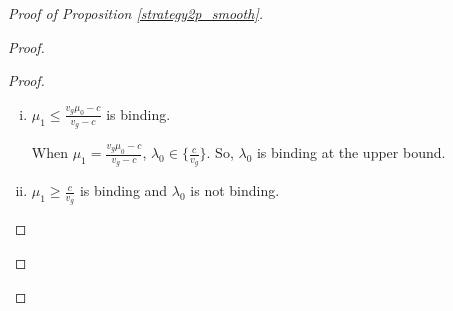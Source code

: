 \documentclass[11pt]{extarticle}
\newcommand{\ra}{\Rightarrow}
\begin{document}
\begin{proof}[Proof of Proposition \ref{strategy2p_smooth}]
\begin{enumerate}
\begin{proof}
\begin{proof}
\begin{enumerate}[i)]
					F.O.C. $\ra \begin{cases}
					-K'(\lambda_0) + p +K(\frac{\mu_1-c}{-v_b})+\frac{(\mu_1-c)p}{v_b}-\eta = 0 \\
					(1-\lambda_0) \left[K'(\frac{\mu_1-c}{-v_b})\cdot \frac{1}{v_b}-\frac{p}{v_b}\right]+\eta \cdot \frac{\mu_0+v_b-c}{(v_b+\mu_1)^2}=0
					\end{cases}$
					
					Plug in $\lambda_0 = \frac{\mu_0-\mu_1-c}{-v_b-\mu_1}$. Dividing the second equality by $\frac{\mu_0+v_b-c}{(v_b+\mu_1)^2}$ and comparing with the first equality, we obtain:
					\begin{align*}
					\eta &= -(v_b+\mu_1)\left[K'(\frac{\mu_1-c}{-v_b})\cdot \frac{1}{v_b}-\frac{p}{v_b}\right]\\
					&=-K'(\lambda_0) + p +K(\frac{\mu_1-c}{-v_b})+\frac{(\mu_1-c)p}{v_b}\\
					\ra~&K(\frac{\mu_1-c}{-v_b})+\frac{v_b+\mu_1}{v_b} K'(\frac{\mu_1-c}{-v_b})-K'(\frac{\mu_0-\mu_1-c}{-v_b-\mu_1})-\frac{cp}{v_b}=0 \tag{$*$}\label{star}
					\end{align*}
					
					$\frac{\partial}{\partial \mu_1} \left[K(\frac{\mu_1-c}{-v_b})+\frac{v_b+\mu_1}{v_b} K'(\frac{\mu_1-c}{-v_b})\right] = -\frac{v_b+\mu_1}{(v_b)^2}K''(\frac{\mu_1-c}{-v_b}) > 0$. So, the sum of the first two terms of the LHS of \eqref{star} strictly increases in $\mu_1$. $\frac{\mu_0-\mu_1-c}{-v_b-\mu_1}$ strictly decreases in $\mu_1$, $K'(\cdot)$ strictly increases in $\mu_1$. So, $-K'(\frac{\mu_0-\mu_1-c}{-v_b-\mu_1})$ strictly increases in $\mu_1$. Thus, the LHS of \eqref{star} strictly increases in $\mu_1$. When $\mu_0$ increases,  the LHS of \eqref{star} is strictly negative if $\mu_1$ is unchanged. Therefore, $\mu_1$ also has to increase. So, the sum of the first two terms of the LHS of \eqref{star} increases. As a result, the third term, $-K'(\frac{\mu_0-\mu_1-c}{-v_b-\mu_1}) = -K'(\lambda_0)$ has to decrease strictly. So, $\lambda_0$ has to increase strictly. In sum, the optimal $\lambda_0$ and $\mu_1$ are strictly increasing in $\mu_0$.
					
					\item $\mu_1\leq \frac{v_g\mu_0-c}{v_g-c}$ is binding.
					
					When $\mu_1 = \frac{v_g\mu_0-c}{v_g-c}$, $\lambda_0 \in \{\frac{c}{v_g}\}$. So, $\lambda_0$ is binding at the upper bound.
					
					\item $\mu_1\geq \frac{c}{v_g}$ is binding and $\lambda_0$ is not binding.
					

\end{enumerate}
\end{proof}
\end{proof}
\end{enumerate}
\end{proof}
\end{document}
